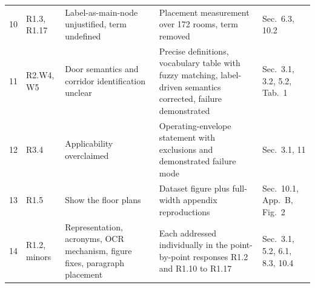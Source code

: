 \begin{longtable}{p{0.5cm} p{2.0cm} p{4.6cm} p{4.9cm} p{2.9cm}}
10 & \textcolor{RevOneCol}{R1.3, R1.17} & Label-as-main-node unjustified, term undefined & Placement measurement over 172 rooms, term removed & Sec.\ 6.3, 10.2 \\
11 & \textcolor{RevTwoCol}{R2.W4, W5} & Door semantics and corridor identification unclear & Precise definitions, vocabulary table with fuzzy matching, label-driven semantics corrected, failure demonstrated & Sec.\ 3.1, 3.2, 5.2, Tab.\ 1 \\
12 & \textcolor{RevThreeCol}{R3.4} & Applicability overclaimed & Operating-envelope statement with exclusions and demonstrated failure mode & Sec.\ 3.1, 11 \\
13 & \textcolor{RevOneCol}{R1.5} & Show the floor plans & Dataset figure plus full-width appendix reproductions & Sec.\ 10.1, App.\ B, Fig.\ 2 \\
14 & \textcolor{RevOneCol}{R1.2, minors} & Representation, acronyms, OCR mechanism, figure fixes, paragraph placement & Each addressed individually in the point-by-point responses R1.2 and R1.10 to R1.17 & Sec.\ 3.1, 5.2, 6.1, 8.3, 10.4 \\
\bottomrule
\end{longtable}
